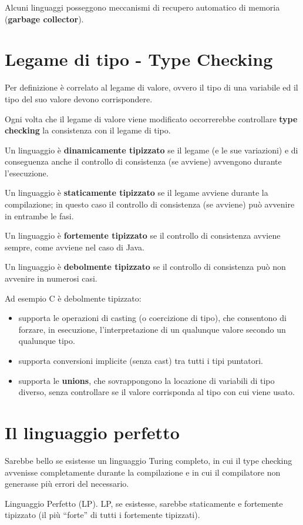 \documentclass[10pt]{article}
\begin{document}
Alcuni linguaggi posseggono meccanismi di recupero automatico di memoria (\textbf{garbage collector}).
\section{Legame di tipo - Type Checking}
Per definizione è correlato al legame di valore, ovvero il tipo di una variabile ed il tipo del suo valore devono corrispondere.

Ogni volta che il legame di valore viene modificato occorrerebbe controllare \textbf{type checking} la consistenza con il legame di tipo.

Un linguaggio è \textbf{dinamicamente tipizzato} se il legame (e le sue variazioni) e di conseguenza anche il controllo di consistenza (se avviene) avvengono durante l'esecuzione.

Un linguaggio è \textbf{staticamente tipizzato} se il legame avviene durante la compilazione; in questo caso il controllo di consistenza (se avviene) può avvenire in entrambe le fasi.

Un linguaggio è \textbf{fortemente tipizzato} se il controllo di consistenza avviene sempre, come avviene nel caso di Java.

Un linguaggio è \textbf{debolmente tipizzato} se il controllo di consistenza può non avvenire in numerosi casi.

Ad esempio C è debolmente tipizzato:
\begin{itemize}

    \item supporta le operazioni di casting (o coercizione di tipo), che consentono di forzare, in esecuzione, l'interpretazione di un qualunque valore secondo un qualunque tipo.
    \item supporta conversioni implicite (senza cast) tra tutti i tipi puntatori.
    \item supporta le \textbf{unions}, che sovrappongono la locazione di variabili di tipo diverso, senza controllare se il valore corrisponda al tipo con cui viene usato.
\end{itemize}
\section{Il linguaggio perfetto}
Sarebbe bello se esistesse un linguaggio Turing completo, in cui il type checking avvenisse completamente durante la compilazione e in cui il compilatore non generasse più errori del necessario.

Linguaggio Perfetto (LP).
LP, se esistesse, sarebbe staticamente e fortemente tipizzato (il più “forte” di tutti i fortemente tipizzati).
\end{document}
